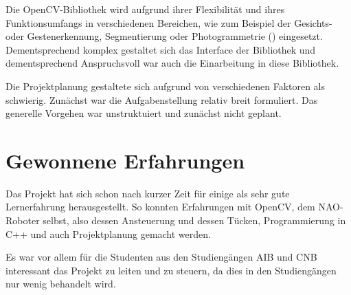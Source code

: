         Die OpenCV-Bibliothek wird aufgrund ihrer Flexibilität und ihres
        Funktionsumfangs in verschiedenen Bereichen, wie zum Beispiel der
        Gesichts- oder Gestenerkennung, Segmentierung oder Photogrammetrie
        (\cite{wiki:opencv}) eingesetzt.
        Dementsprechend komplex gestaltet sich das Interface der Bibliothek und
        dementsprechend Anspruchsvoll war auch die Einarbeitung in diese
        Bibliothek.

        Die Projektplanung gestaltete sich aufgrund von verschiedenen Faktoren
        als schwierig.
        Zunächst war die Aufgabenstellung relativ breit formuliert.
        Das generelle Vorgehen war unstruktuiert und zunächst nicht geplant.

    \section{Gewonnene Erfahrungen}

        Das Projekt hat sich schon nach kurzer Zeit für einige als sehr gute
        Lernerfahrung herausgestellt.
        So konnten Erfahrungen mit OpenCV, dem NAO-Roboter selbst, also dessen
        Ansteuerung und dessen Tücken, Programmierung in C++ und auch
        Projektplanung gemacht werden.

        Es war vor allem für die Studenten aus den Studiengängen AIB und CNB
        interessant das Projekt zu leiten und zu steuern, da dies in den
        Studiengängen nur wenig behandelt wird.

